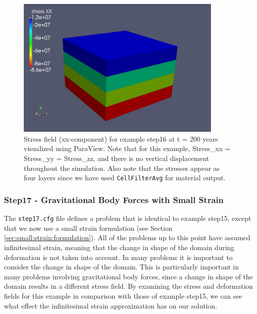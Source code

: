 \begin{figure}
\begin{centering}
\includegraphics[width=10cm]{tutorials/3dhex8/figs/step16-stress_xx-t200}
\par\end{centering}

\caption{Stress field (xx-component) for example step16 at t = 200 years visualized
using ParaView. Note that for this example, Stress\_xx = Stress\_yy
= Stress\_zz, and there is no vertical displacement throughout the
simulation. Also note that the stresses appear as four layers since
we have used \texttt{CellFilterAvg} for material output.\label{fig:step16-stress_xx-t200}}
\end{figure}



\subsubsection{Step17 - Gravitational Body Forces with Small Strain}

The \texttt{step17.cfg} file defines a problem that is identical to
example step15, except that we now use a small strain formulation
(see Section \vref{sec:small:strain:formulation}). All of the problems
up to this point have assumed infinitesimal strain, meaning that the
change in shape of the domain during deformation is not taken into
account. In many problems it is important to consider the change in
shape of the domain. This is particularly important in many problems
involving gravitational body forces, since a change in shape of the
domain results in a different stress field. By examining the stress
and deformation fields for this example in comparison with those of
example step15, we can see what effect the infinitesimal strain approximation
has on our solution.

